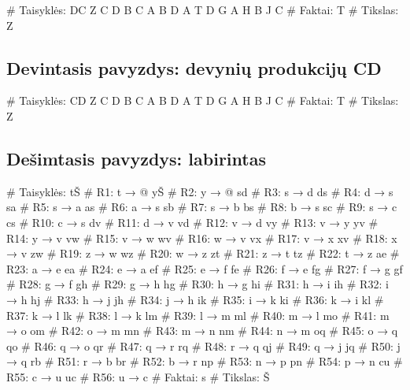 \begin{pythonaienv}[bc]
# Taisyklės:
DC Z
C D
B C
A B
D A
T D
G A
H B
J C
# Faktai:
T
# Tikslas:
Z
\end{pythonaienv}

\subsection{Devintasis pavyzdys: devynių produkcijų CD}

\begin{pythonaienv}[bc]
# Taisyklės:
CD Z
C D
B C
A B
D A
T D
G A
H B
J C
# Faktai:
T
# Tikslas:
Z
\end{pythonaienv}

\subsection{Dešimtasis pavyzdys: labirintas}

\begin{pythonaienv}[bc]
# Taisyklės:
tŠ             # R1: t → @
yŠ             # R2: y → @
sd             # R3: s → d
ds             # R4: d → s
sa             # R5: s → a
as             # R6: a → s
sb             # R7: s → b
bs             # R8: b → s
sc             # R9: s → c
cs             # R10: c → s
dv             # R11: d → v
vd             # R12: v → d
vy             # R13: v → y
yv             # R14: y → v
vw             # R15: v → w
wv             # R16: w → v
vx             # R17: v → x
xv             # R18: x → v
zw             # R19: z → w
wz             # R20: w → z
zt             # R21: z → t
tz             # R22: t → z
ae             # R23: a → e
ea             # R24: e → a
ef             # R25: e → f
fe             # R26: f → e
fg             # R27: f → g
gf             # R28: g → f
gh             # R29: g → h
hg             # R30: h → g
hi             # R31: h → i
ih             # R32: i → h
hj             # R33: h → j
jh             # R34: j → h
ik             # R35: i → k
ki             # R36: k → i
kl             # R37: k → l
lk             # R38: l → k
lm             # R39: l → m
ml             # R40: m → l
mo             # R41: m → o
om             # R42: o → m
mn             # R43: m → n
nm             # R44: n → m
oq             # R45: o → q
qo             # R46: q → o
qr             # R47: q → r
rq             # R48: r → q
qj             # R49: q → j
jq             # R50: j → q
rb             # R51: r → b
br             # R52: b → r
np             # R53: n → p
pn             # R54: p → n
cu             # R55: c → u
uc             # R56: u → c
# Faktai:
s
# Tikslas:
Š
\end{pythonaienv}
